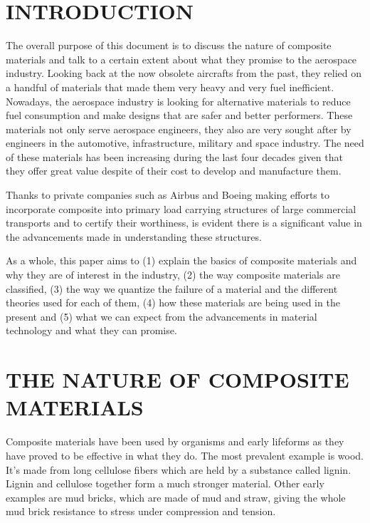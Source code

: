 \documentclass[letterpaper]{article}
\begin{document}
\begin{multicols}{2}
	\section{INTRODUCTION}
	The overall purpose of this document is to discuss the nature of composite materials and talk to a certain extent about what they promise to the aerospace industry. Looking back at the now obsolete aircrafts from the past, they relied on a handful of materials that made them very heavy and very fuel inefficient. Nowadays, the aerospace industry is looking for alternative materials to reduce fuel consumption and make designs that are safer and better performers. These materials not only serve aerospace engineers, they also are very sought after by engineers in the automotive, infrastructure, military and space industry. The need of these materials has been increasing during the last four decades given that they offer great value despite of their cost to develop and manufacture them.

	Thanks to private companies such as Airbus and Boeing making efforts to incorporate composite into primary load carrying structures of large commercial transports and to certify their worthiness, is evident there is a significant value in the advancements made in understanding these structures. \supercite{nasa09}

	As a whole, this paper aims to (1) explain the basics of composite materials and why they are of interest in the industry, (2) the way composite materials are classified, (3) the way we quantize the failure of a material and the different theories used for each of them, (4) how these materials are being used in the present and (5) what we can expect from the advancements in material technology and what they can promise.
	\section{THE NATURE OF COMPOSITE MATERIALS}
	Composite materials have been used by organisms and early lifeforms as they have proved to be effective in what they do. The most prevalent example is wood. It's made from long cellulose fibers which are held by a substance called lignin. Lignin and cellulose together form a much stronger material. Other early examples are mud bricks, which are made of mud and straw, giving the whole mud brick resistance to stress under compression and tension.


\end{multicols}
\end{document}
